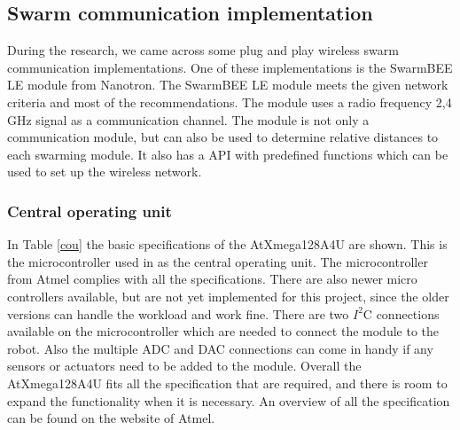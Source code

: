 \documentclass[10pt,a4paper]{article}
\begin{document}
\subsection{Swarm communication implementation}
During the research, we came across some plug and play wireless swarm communication implementations. One of these implementations is the SwarmBEE LE module from Nanotron. The SwarmBEE LE module meets the given network criteria and most of the recommendations. The module uses a radio frequency 2,4 GHz signal as a communication channel. The module is not only a communication module, but can also be used to determine relative distances to each swarming module. It also has a API with predefined functions which can be used to set up the wireless network.



\subsubsection{Central operating unit}

In Table \ref{cou} the basic specifications of the AtXmega128A4U are shown. This is the microcontroller used in as the central operating unit. The microcontroller from Atmel complies with all the specifications. There are also newer micro controllers available, but are not yet implemented for this project, since the older versions can handle the workload and work fine. There are two $I^2$C connections available on the microcontroller which are needed to connect the module to the robot. Also the multiple ADC and DAC connections can come in handy if any sensors or actuators need to be added to the module. Overall the AtXmega128A4U fits all the specification that are required, and there is room to expand the functionality when it is necessary. An overview of all the specification can be found on the website of Atmel.
\end{document}
